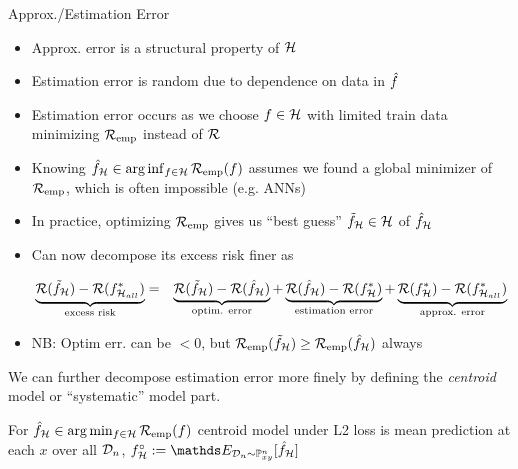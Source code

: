 \documentclass[11pt,compress,t,notes=noshow, xcolor=table]{beamer}
\begin{document}

\begin{vbframe}{Approx./Estimation Error }
    
\begin{itemize}
    \item Approx. error is a structural property of $\mathcal{H}$
    \item Estimation error is random due to dependence on data in $\hat{f}$
    \item Estimation error occurs as we choose $f \in \mathcal{H}$ with limited train data minimizing $\mathcal{R}_{\text{emp}}$ instead of $\mathcal{R}$

\item Knowing $\hat{f}_{\mathcal{H}} \in \arg\inf_{f \in \mathcal{H}} \mathcal{R}_{\text{emp}}(f)$ assumes we found a global minimizer of $\mathcal{R}_{\text{emp}}$, which is often impossible (e.g. ANNs) 

\item In practice, optimizing $\mathcal{R}_{\text{emp}}$ gives us ``best guess'' $\tilde{f}_{\mathcal{H}} \in \mathcal{H}$ of $\hat{f}_{\mathcal{H}}$ 

\item Can now decompose its excess risk finer as

\begin{eqnarray*}
    \underbrace{\mathcal{R}(\tilde{f}_{\mathcal{H}}) - \mathcal{R}(f^{\ast}_{\mathcal{H}_{all}})}_{\text{excess risk}} &=& \underbrace{\mathcal{R}(\tilde{f}_{\mathcal{H}}) - \mathcal{R}(\hat{f}_{\mathcal{H}})}_{\text{optim. error}} + \underbrace{\mathcal{R}(\hat{f}_{\mathcal{H}}) - \mathcal{R}(f^{\ast}_{\mathcal{H}})}_{\text{estimation error}} + \underbrace{\mathcal{R}(f^{\ast}_{\mathcal{H}}) -  \mathcal{R}(f^{\ast}_{\mathcal{H}_{all}})}_{\text{approx. error}} 
\end{eqnarray*}

\item NB: Optim err. can be $< 0$, but $\mathcal{R}_{\text{emp}}(\tilde{f}_{\mathcal{H}}) \geq \mathcal{R}_{\text{emp}}(\hat{f}_{\mathcal{H}})$ always

\end{itemize}

\framebreak

\begin{itemizeM}

\item We can further decompose estimation error more finely by defining the \textit{centroid} model or ``systematic'' model part.\\

\item For $\hat{f}_{\mathcal{H}} \in  \arg\min_{f \in \mathcal{H}} \mathcal{R}_{\text{emp}}(f)$ centroid model under L2 loss is mean prediction at each $x$ over all $\mathcal{D}_n$, $f^{\circ}_{\Hspace} := \E_{\D_n \sim \Pxy^n}[\fh_{\Hspace}] $


\end{itemizeM}
\end{vbframe}
\end{document}

